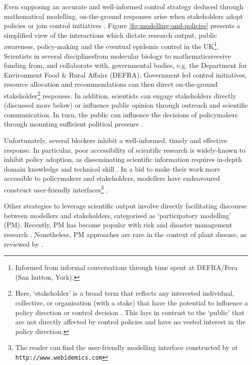 Even supposing an accurate and well-informed control strategy deduced through mathematical modelling,
on-the-ground responses arise when stakeholders adopt policies or join control initiatives \cite{reed2018theory}.
Figure \ref{fig:modelling-and-policies} presents a simplified view of the interactions which dictate research output, public awareness, 
policy-making and the eventual epidemic control in the UK\footnote{Informed from informal conversations through time spent at DEFRA/Fera (San hutton, York).}.
Scientists in several disciplines\textemdash from molecular biology to mathematics\textemdash receive funding from, 
and collaborate with, governmental bodies, e.g. the Department for Environment Food \& Rural Affairs (DEFRA). 
Government led control initiatives, resource allocation and recommendations can then direct on-the-ground 
stakeholder\footnote{Here, `stakeholder' is a broad term that reflects any interested individual, collective, or organisation 
(with a stake) that have the potential to influence a policy direction or control decision \cite{brugha2000stakeholder}.
This lays in contrast to the `public' that are not directly affected by control policies and have no vested interest in the policy direction.} 
responses. 
In addition, scientists can engage stakeholders directly (discussed more below) or
influence public opinion through outreach and scientific communication. In turn, the public can influence
the decisions of policymakers through mounting sufficient political pressure \cite{fuller2016public}.

Unfortunately, several blockers inhibit a well-informed, timely and effective response. 
In particular, poor accessibility of scientific research is widely-known to inhibit policy adoption,
as disseminating scientific information requires in-depth domain knowledge and technical skill \cite{jones2020modelling}.
In a bid to make their work more accessible to policymakers and stakeholders, modellers have endeavoured construct user-friendly interfaces\footnote{
The reader can find the user-friendly modelling interface constructed by \cite{WEBIDEMICS} at \nolinkurl{http://www.webidemics.com}} \cite{WEBIDEMICS}.

Other strategies to leverage scientific output involve directly facilitating discourse between modellers and
stakeholders, categorised as `participatory modelling' (PM).
Recently, PM has become popular with risk and disaster management 
research \cite{hamalainen2020leadership, ravera2020participatory, hedelin2017participatory}.
Nonetheless, PM approaches are rare in the context of plant disease, as reviewed by \cite{gaydos2019forecasting}.

